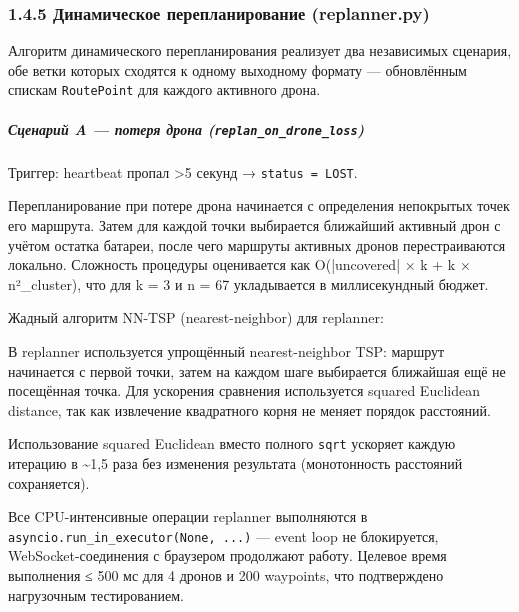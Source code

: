 \documentclass[14pt,a4paper]{extarticle}
\begin{document}
\hypertarget{ux434ux438ux43dux430ux43cux438ux447ux435ux441ux43aux43eux435-ux43fux435ux440ux435ux43fux43bux430ux43dux438ux440ux43eux432ux430ux43dux438ux435-replanner.py}{%
\subsubsection{1.4.5 Динамическое перепланирование (replanner.py)}\label{ux434ux438ux43dux430ux43cux438ux447ux435ux441ux43aux43eux435-ux43fux435ux440ux435ux43fux43bux430ux43dux438ux440ux43eux432ux430ux43dux438ux435-replanner.py}}

Алгоритм динамического перепланирования реализует два независимых сценария, обе ветки которых сходятся к одному выходному формату --- обновлённым спискам \texttt{RoutePoint} для каждого активного дрона.

\hypertarget{ux441ux446ux435ux43dux430ux440ux438ux439-a-ux43fux43eux442ux435ux440ux44f-ux434ux440ux43eux43dux430-replan_on_drone_loss}{%
\subparagraph{\texorpdfstring{Сценарий A --- потеря дрона (\texttt{replan\_on\_drone\_loss})}{Сценарий A --- потеря дрона (replan\_on\_drone\_loss)}}\label{ux441ux446ux435ux43dux430ux440ux438ux439-a-ux43fux43eux442ux435ux440ux44f-ux434ux440ux43eux43dux430-replan_on_drone_loss}}

Триггер: heartbeat пропал \textgreater5 секунд → \texttt{status\ =\ LOST}.

Перепланирование при потере дрона начинается с определения непокрытых точек его маршрута. Затем для каждой точки выбирается ближайший активный дрон с учётом остатка батареи, после чего маршруты активных дронов перестраиваются локально. Сложность процедуры оценивается как O(|uncovered| × k + k × n²_cluster), что для k = 3 и n = 67 укладывается в миллисекундный бюджет.


Жадный алгоритм NN-TSP (nearest-neighbor) для replanner:

В replanner используется упрощённый nearest-neighbor TSP: маршрут начинается с первой точки, затем на каждом шаге выбирается ближайшая ещё не посещённая точка. Для ускорения сравнения используется squared Euclidean distance, так как извлечение квадратного корня не меняет порядок расстояний.


Использование squared Euclidean вместо полного \texttt{sqrt} ускоряет каждую итерацию в \textasciitilde1,5 раза без изменения результата (монотонность расстояний сохраняется).

Все CPU-интенсивные операции replanner выполняются в \texttt{asyncio.run\_in\_executor(None,\ ...)} --- event loop не блокируется, WebSocket-соединения с браузером продолжают работу. Целевое время выполнения ≤ 500 мс для 4 дронов и 200 waypoints, что подтверждено нагрузочным тестированием.
\end{document}
